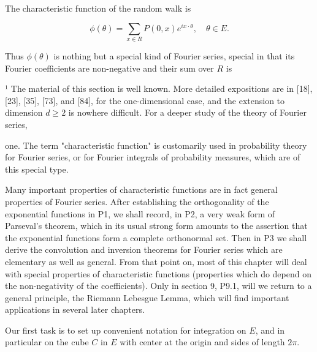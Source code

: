 The characteristic function of the random walk is

$$\phi(\theta) = \sum_{x \in R} P(0,x) e^{ix \cdot \theta}, \quad \theta \in E.$$

Thus $\phi(\theta)$ is nothing but a special kind of Fourier series, special in that its Fourier coefficients are non-negative and their sum over $R$ is

¹ The material of this section is well known. More detailed expositions are in [18], [23], [35], [73], and [84], for the one-dimensional case, and the extension to dimension $d \geq 2$ is nowhere difficult. For a deeper study of the theory of Fourier series,

one. The term "characteristic function" is customarily used in probability theory for Fourier series, or for Fourier integrals of probability measures, which are of this special type.

Many important properties of characteristic functions are in fact general properties of Fourier series. After establishing the orthogonality of the exponential functions in P1, we shall record, in P2, a very weak form of Parseval's theorem, which in its usual strong form amounts to the assertion that the exponential functions form a complete orthonormal set. Then in P3 we shall derive the convolution and inversion theorems for Fourier series which are elementary as well as general. From that point on, most of this chapter will deal with special properties of characteristic functions (properties which do depend on the non-negativity of the coefficients). Only in section 9, P9.1, will we return to a general principle, the Riemann Lebesgue Lemma, which will find important applications in several later chapters.

Our first task is to set up convenient notation for integration on $E$, and in particular on the cube $C$ in $E$ with center at the origin and sides of length $2\pi$.
